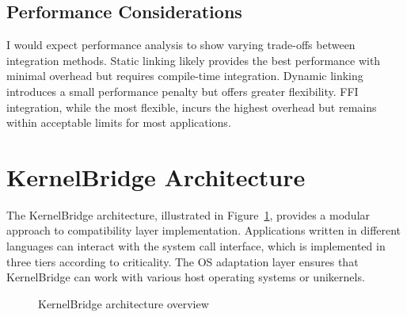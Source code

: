 \documentclass[conference]{IEEEtran}
\begin{document}
\subsection{Performance Considerations}

I would expect performance analysis to show varying trade-offs between integration methods. Static
linking likely provides the best performance with minimal overhead but requires compile-time integration. Dynamic linking introduces a small performance penalty but offers greater flexibility. FFI integration, while the most flexible, incurs the highest overhead but remains within acceptable limits for most applications.

\section{KernelBridge Architecture}

The KernelBridge architecture, illustrated in Figure~\ref{fig:bridge}, provides a modular approach to compatibility layer implementation. Applications written in different languages can interact with the system call interface, which is implemented in three tiers according to criticality. The OS adaptation layer ensures that KernelBridge can work with various host operating systems or unikernels.

\begin{figure}[t]
	\centering
	\caption{KernelBridge architecture overview}
	\label{fig:bridge}
\end{figure}
\end{document}
